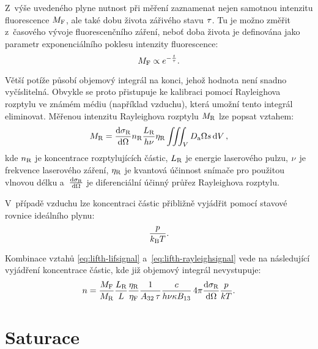 Z~výše uvedeného plyne nutnost při měření zaznamenat nejen samotnou
intenzitu fluorescence $M_\text{F}$,
ale také dobu života zářivého stavu $\tau$.
Tu je možno změřit z~časového vývoje fluorescenčního záření,
neboť doba života je definována jako parametr exponenciálního poklesu
intenzity fluorescence:
\begin{equation}
	M_\text{F} \propto e^{-\frac{t}{\tau}}.
\end{equation}

Větší potíže působí objemový integrál na konci, jehož hodnota není snadno
vyčíslitelná.
Obvykle se proto přistupuje ke kalibraci pomocí Ray\-leigh\-ova rozptylu
ve známém médiu (například vzduchu),
která umožní tento integrál eliminovat.
Měřenou intenzitu Rayleighova rozptylu $M_\text{R}$ lze popsat vztahem:
\begin{equation}
	\label{eq:lifth-rayleighsignal}
	M_\text{R} = \dv{\sigma_\text{R}}{\Omega} n_\text{R}
	\frac{L_\text{R}}{h\nu} \eta_\text{R}
	\iiint_V D_\text{a} \Omega s \dd{V},
\end{equation}
kde $n_\text{R}$ je koncentrace rozptylujících částic,
$L_\text{R}$ je energie laserového pulzu,
$\nu$ je frekvence laserového záření,
$\eta_\text{R}$ je kvantová účinnost snímače pro použitou vlnovou délku
a~$\dv{\sigma_\text{R}}{\Omega}$ je diferenciální účinný průřez Rayleighova rozptylu.

V~případě vzduchu lze koncentraci částic přibližně vyjádřit pomocí
stavové rovnice ideálního plynu:
\begin{equation}
	\frac{p}{k_\text{B}T}.
\end{equation}


Kombinace vztahů \eqref{eq:lifth-lifsignal} a~\eqref{eq:lifth-rayleighsignal}
vede na následující vyjádření koncentrace částic,
kde již objemový integrál nevystupuje:
\begin{equation}
	\label{eq:lifth-ndens}
	n = \frac{M_\text{F}}{M_\text{R}}
	\frac{L_\text{R}}{L}\frac{\eta_\text{R}}{\eta_\text{F}}
	\frac{1}{A_{32}\,\tau}
	\frac{c}{h\nu\kappa B_{13}}
	\, 4\pi \dv{\sigma_\text{R}}{\Omega} \frac{p}{kT}.
\end{equation}

\section{Saturace}
\label{sec:lifth-saturation}
